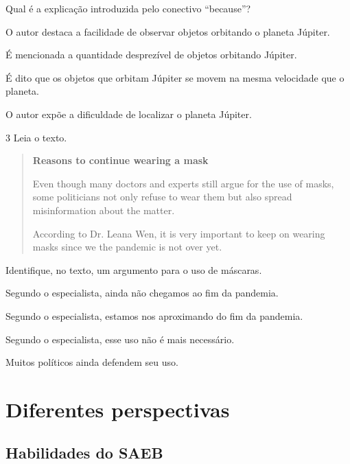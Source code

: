 Qual é a explicação introduzida pelo conectivo ``because''?

\begin{escolha}
\item O autor destaca a facilidade de observar objetos orbitando o planeta
Júpiter.

\item É mencionada a quantidade desprezível de objetos orbitando Júpiter.

\item É dito que os objetos que orbitam Júpiter se movem na mesma
velocidade que o planeta.

\item O autor expõe a dificuldade de localizar o planeta Júpiter.
\end{escolha}

\num{3} Leia o texto.


\begin{quote}
\textbf{Reasons to continue wearing a mask}

Even though many doctors and experts still argue for the use of masks, some politicians not only refuse to wear them but also spread misinformation about the matter.

According to Dr. Leana Wen, it is very important to keep on wearing masks since we the pandemic is not over yet. 

\end{quote}

Identifique, no texto, um argumento para o uso de máscaras.

\begin{escolha}
\item Segundo o especialista, ainda não chegamos ao fim da pandemia.

\item Segundo o especialista, estamos nos aproximando do fim da pandemia.

\item Segundo o especialista, esse uso não é mais necessário.

\item Muitos políticos ainda defendem seu uso.
\end{escolha}

\chapter{Diferentes perspectivas}


\section{Habilidades do SAEB}

